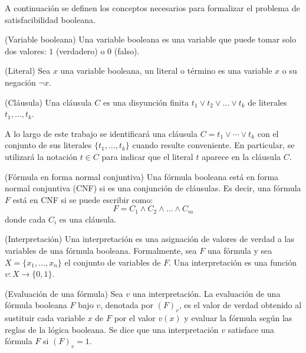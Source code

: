 A continuación se definen los conceptos necesarios para formalizar el problema de satisfacibilidad booleana.

\begin{definition}{(Variable booleana)}
	Una variable booleana es una variable que puede tomar solo dos valores: $1$ (verdadero) o $0$ (falso).
\end{definition}

\begin{definition}{(Literal)}
	Sea $x$ una variable booleana, un literal o término es una variable $x$ o su negación $\neg x$.
\end{definition}

\begin{definition}{(Cláusula)}
	Una cláusula $C$ es una disyunción finita $t_1 \lor t_2 \lor \dots \lor t_k$ de literales $t_1, \ldots, t_k$.
\end{definition}

A lo largo de este trabajo se identificará una cláusula $C=t_1 \lor \cdots \lor t_k$ con el conjunto de sus literales $\{t_1,\ldots,t_k\}$ cuando resulte conveniente. En particular, se utilizará la notación $t \in C$ para indicar que el literal $t$ aparece en la cláusula $C$.

\begin{definition}{(Fórmula en forma normal conjuntiva)}
	Una fórmula booleana está en forma normal conjuntiva (CNF) si es una conjunción de cláusulas. Es decir, una fórmula $F$ está en CNF si se puede escribir como:
	$$
		F = C_1 \land C_2 \land \dots \land C_m
	$$
	donde cada $C_i$ es una cláusula.

\end{definition}


\begin{definition}{(Interpretación)}
	Una interpretación es una asignación de valores de verdad a las variables de una fórmula booleana. Formalmente, sea $F$ una fórmula y sea $X = \{x_1, \ldots, x_n\}$ el conjunto de variables de $F$. Una interpretación es una función $v: X \to \{0, 1\}$.
\end{definition}

\begin{definition}{(Evaluación de una fórmula)}
	Sea $v$ una interpretación. La evaluación de una fórmula booleana $F$ bajo $v$, denotada por $(F)_v$, es el valor de verdad obtenido al sustituir cada variable $x$ de $F$ por el valor $v(x)$ y evaluar la fórmula según las reglas de la lógica booleana. Se dice que una interpretación $v$ satisface una fórmula $F$ si $(F)_v = 1$.
\end{definition}


